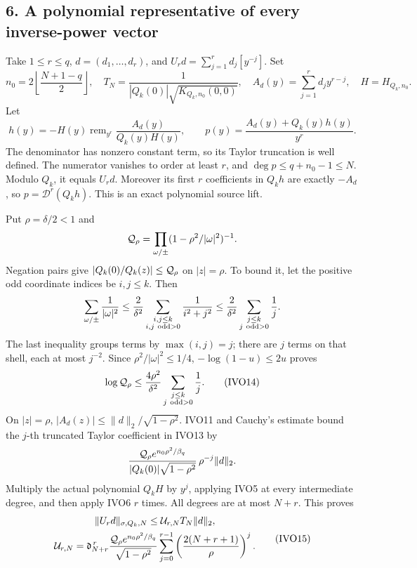 \documentclass[11pt]{article}
\begin{document}
\subsection{6. A polynomial representative of every inverse-power vector}\label{a-polynomial-representative-of-every-inverse-power-vector}

Take \(1\le r\le q\), \(d=(d_1,\ldots,d_r)\), and \(U_rd=\sum_{j=1}^rd_j[y^{-j}]\). Set \[
n_0=2\left\lfloor\frac{N+1-q}{2}\right\rfloor,\quad
T_N=\frac1{|Q_k(0)|\sqrt{K_{Q_k,n_0}(0,0)}},\quad
A_d(y)=\sum_{j=1}^rd_jy^{r-j},\quad H=H_{Q_k,n_0}.
\] Let \[
h(y)=-H(y)\operatorname{rem}_{y^r}\frac{A_d(y)}{Q_k(y)H(y)},\qquad
p(y)=\frac{A_d(y)+Q_k(y)h(y)}{y^r}.
\tag{IVO13}
\] The denominator has nonzero constant term, so its Taylor truncation is well defined. The numerator vanishes to order at least \(r\), and \(\deg p\le q+n_0-1\le N\). Modulo \(Q_k\), it equals \(U_rd\). Moreover its first \(r\) coefficients in \(Q_kh\) are exactly \(-A_d\), so \(p={\mathscr D}^r(Q_kh)\). This is an exact polynomial source lift.

Put \(\rho=\delta/2<1\) and \[
{\cal Q}_\rho=\prod_{\omega/\pm}
(1-\rho^2/|\omega|^2)^{-1}.
\] Negation pairs give \(|Q_k(0)/Q_k(z)|\le{\cal Q}_\rho\) on \(|z|=\rho\). To bound it, let the positive odd coordinate indices be \(i,j\le k\). Then \[
\sum_{\omega/\pm}\frac1{|\omega|^2}
\le\frac2{\delta^2}\sum_{\substack{i,j\le k\\i,j\ {\rm odd}>0}}\frac1{i^2+j^2}
\le\frac2{\delta^2}\sum_{\substack{j\le k\\j\ {\rm odd}>0}}\frac1j.
\] The last inequality groups terms by \(\max(i,j)=j\); there are \(j\) terms on that shell, each at most \(j^{-2}\). Since \(\rho^2/|\omega|^2\le1/4\), \(-\log(1-u)\le2u\) proves \[
\log{\cal Q}_\rho\le
\frac{4\rho^2}{\delta^2}\sum_{\substack{j\le k\\j\ {\rm odd}>0}}\frac1j.
\tag{IVO14}
\] On \(|z|=\rho\), \(|A_d(z)|\le\|d\|_2/\sqrt{1-\rho^2}\). IVO11 and Cauchy's estimate bound the \(j\)-th truncated Taylor coefficient in IVO13 by \[
\frac{{\cal Q}_\rho e^{n_0\rho^2/\beta_q}}
{|Q_k(0)|\sqrt{1-\rho^2}}\,\rho^{-j}\|d\|_2.
\] Multiply the actual polynomial \(Q_kH\) by \(y^j\), applying IVO5 at every intermediate degree, and then apply IVO6 \(r\) times. All degrees are at most \(N+r\). This proves \[
\begin{gathered}
\|U_rd\|_{\sigma,Q_k,N}\le{\cal U}_{r,N}T_N\|d\|_2,\\
{\cal U}_{r,N}=
\mathfrak d_{N+r}^{\,r}
\frac{{\cal Q}_\rho e^{n_0\rho^2/\beta_q}}{\sqrt{1-\rho^2}}
\sum_{j=0}^{r-1}\left(\frac{2(N+r+1)}{\rho}\right)^j.
\end{gathered}\tag{IVO15}
\]
\end{document}
